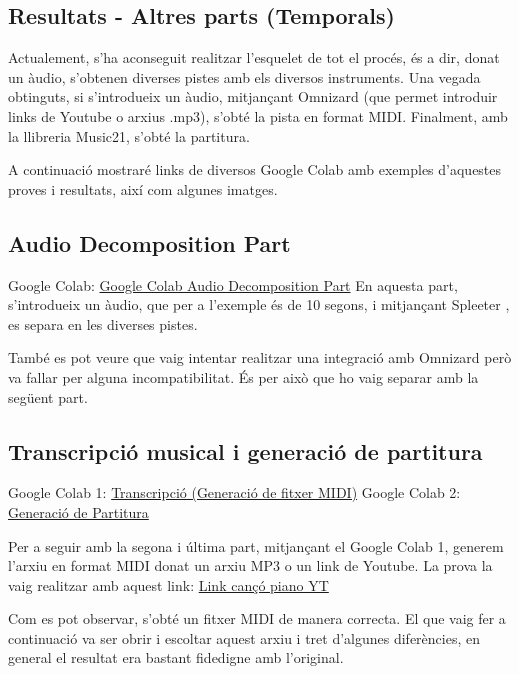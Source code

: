 \documentclass[10pt,a4paper,twocolumn,twoside]{article}
\begin{document}
\subsection{Resultats - Altres parts (Temporals)}

Actualement, s'ha aconseguit realitzar l'esquelet de tot el procés, és a dir, donat un àudio, s'obtenen diverses pistes amb els diversos instruments. Una vegada obtinguts, si s'introdueix un àudio, mitjançant Omnizard (que permet introduir links de Youtube o arxius .mp3), s'obté la pista en format MIDI. Finalment, amb la llibreria Music21, s'obté la partitura.

A continuació mostraré links de diversos Google Colab amb exemples d'aquestes proves i resultats, així com algunes imatges.

\subsection{Audio Decomposition Part}

Google Colab: \href{https://colab.research.google.com/drive/1hnlwqaULE_wZDV8ZtSGldOrITDW8WQJs?usp=sharing}{Google Colab Audio Decomposition Part}
En aquesta part, s'introdueix un àudio, que per a l'exemple és de 10 segons, i mitjançant Spleeter \cite{spleeter2020}, es separa en les diverses pistes.

També es pot veure que vaig intentar realitzar una integració amb Omnizard però va fallar per alguna incompatibilitat. És per això que ho vaig separar amb la següent part.

\subsection{Transcripció musical i generació de partitura}

Google Colab 1: \href{https://colab.research.google.com/drive/1W1kDEtN0w8kRLiUZLePwhXBxqFlJAA4x?usp=sharing}{Transcripció (Generació de fitxer MIDI)}
Google Colab 2: \href{https://colab.research.google.com/drive/1tiGLzMGYfOxaYQx5lRwElC0yLjdWvwAU?usp=sharing}{Generació de Partitura}

Per a seguir amb la segona i última part, mitjançant el Google Colab 1, generem l'arxiu en format MIDI donat un arxiu MP3 o un link de Youtube.
La prova la vaig realitzar amb aquest link: \href{https://www.youtube.com/watch?v=aCUI6dNECeA&ab_channel=tocapartituras.com}{Link cançó piano YT}

Com es pot observar, s'obté un fitxer MIDI de manera correcta. El que vaig fer a continuació va ser obrir i escoltar aquest arxiu i tret d'algunes diferències, en general el resultat era bastant fidedigne amb l'original.
\end{document}
